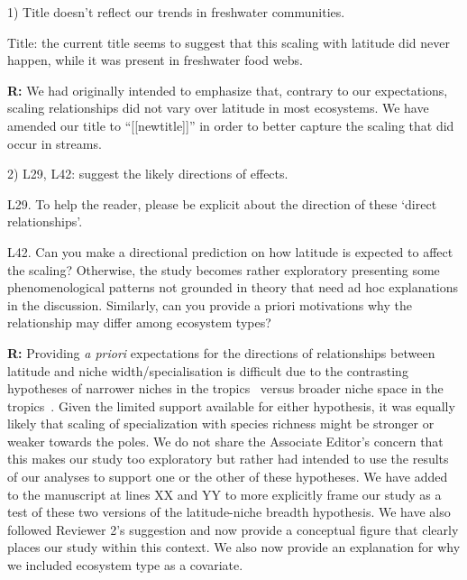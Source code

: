 \documentclass[12pt]{letter}
\newenvironment{refquote}{\bigskip \begin{it}}{\end{it}\smallskip}
\begin{document}
  1) Title doesn't reflect our trends in freshwater communities.

  \begin{refquote}

    Title: the current title seems to suggest that this scaling with latitude
    did never happen, while it was present in freshwater food webs.

  \end{refquote}


  \textbf{R:} We had originally intended to emphasize that, contrary to our expectations,
  scaling relationships did not vary over latitude in most ecosystems. We have amended our
  title to ``[[newtitle]]'' in order to better capture the scaling that did occur in streams.


  2) L29, L42: suggest the likely directions of effects.

  \begin{refquote}

    L29. To help the reader, please be explicit about the direction of these ‘direct relationships’.

    \smallskip

    L42. Can you make a directional prediction on how latitude is expected to
    affect the scaling? Otherwise, the study becomes rather exploratory
    presenting some phenomenological patterns not grounded in theory that need
    ad hoc explanations in the discussion. Similarly, can you provide a priori
    motivations why the relationship may differ among ecosystem types?

  \end{refquote}


  \textbf{R:} Providing \emph{a priori} expectations for the directions of
    relationships between latitude and niche width/specialisation is difficult due
    to the contrasting hypotheses of narrower niches in the
    tropics~\citep{Vazquez2004} versus broader niche space in the
    tropics~\citep{Davies2007}. Given the limited support available for either
    hypothesis, it was equally likely that scaling of specialization with species
    richness might be stronger or weaker towards the poles.    We do not share the
    Associate Editor's concern that this makes our study too exploratory but
    rather had intended to use the results of our analyses to support one or the
    other of these hypotheses. We have added to the manuscript at lines XX and YY
    to more explicitly frame our study as a test of these two versions of the
    latitude-niche breadth hypothesis. We have also followed   Reviewer 2's
    suggestion and now provide a conceptual figure that clearly places our study
    within this context. We also now provide an explanation for why we included
    ecosystem type as a covariate.
\end{document}
